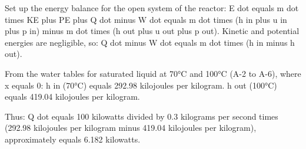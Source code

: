Set up the energy balance for the open system of the reactor:  
E dot equals m dot times KE plus PE plus Q dot minus W dot equals m dot times (h in plus u in plus p in) minus m dot times (h out plus u out plus p out).  
Kinetic and potential energies are negligible, so:  
Q dot minus W dot equals m dot times (h in minus h out).  

From the water tables for saturated liquid at 70°C and 100°C (A-2 to A-6), where x equals 0:  
h in (70°C) equals 292.98 kilojoules per kilogram.  
h out (100°C) equals 419.04 kilojoules per kilogram.  

Thus:  
Q dot equals 100 kilowatts divided by 0.3 kilograms per second times (292.98 kilojoules per kilogram minus 419.04 kilojoules per kilogram), approximately equals 6.182 kilowatts.